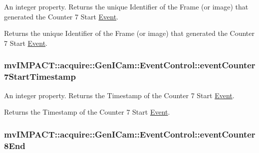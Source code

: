 An integer property. Returns the unique Identifier of the Frame (or image) that generated the Counter 7 Start \hyperlink{classmv_i_m_p_a_c_t_1_1acquire_1_1_event}{Event}. 

Returns the unique Identifier of the Frame (or image) that generated the Counter 7 Start \hyperlink{classmv_i_m_p_a_c_t_1_1acquire_1_1_event}{Event}. \hypertarget{classmv_i_m_p_a_c_t_1_1acquire_1_1_gen_i_cam_1_1_event_control_ad3160ba228d21c89a92b445c025939f8}{
\subsubsection[{event\+Counter7\+Start\+Timestamp}]{ mv\+I\+M\+P\+A\+C\+T\+::acquire\+::\+Gen\+I\+Cam\+::\+Event\+Control\+::event\+Counter7\+Start\+Timestamp}}\label{classmv_i_m_p_a_c_t_1_1acquire_1_1_gen_i_cam_1_1_event_control_ad3160ba228d21c89a92b445c025939f8}


An integer property. Returns the Timestamp of the Counter 7 Start \hyperlink{classmv_i_m_p_a_c_t_1_1acquire_1_1_event}{Event}. 

Returns the Timestamp of the Counter 7 Start \hyperlink{classmv_i_m_p_a_c_t_1_1acquire_1_1_event}{Event}. \hypertarget{classmv_i_m_p_a_c_t_1_1acquire_1_1_gen_i_cam_1_1_event_control_ac6cf49e99ae7bed8b641f962b004b5ce}{
\subsubsection[{event\+Counter8\+End}]{ mv\+I\+M\+P\+A\+C\+T\+::acquire\+::\+Gen\+I\+Cam\+::\+Event\+Control\+::event\+Counter8\+End}}\label{classmv_i_m_p_a_c_t_1_1acquire_1_1_gen_i_cam_1_1_event_control_ac6cf49e99ae7bed8b641f962b004b5ce}


